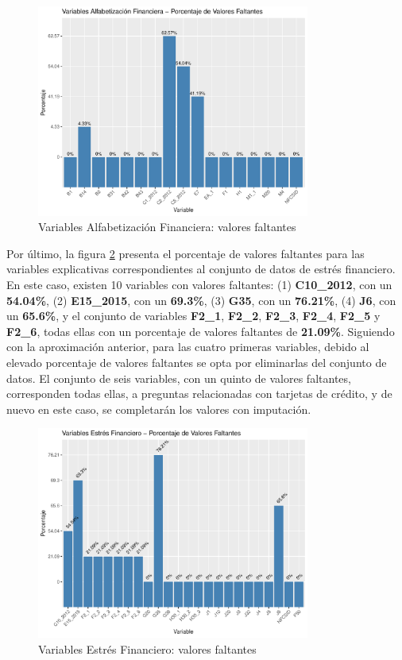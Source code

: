 \documentclass[a4paper, 11pt]{article}
\begin{document}
\begin{figure}[ht]
    \centering
    \includegraphics[width=0.8\textwidth]{images/Capabilities_Features__Missing_Values.pdf} 
    \caption{Variables Alfabetización Financiera: valores faltantes}
    \label{fig:capabilities_features_missing_values}
\end{figure}

Por último, la figura \ref{fig:stress_features_missing_values} presenta el porcentaje de valores
faltantes para las variables explicativas correspondientes al conjunto de datos de estrés
financiero. En este caso, existen 10 variables con valores faltantes: (1) \textbf{C10\_2012}, con 
un \textbf{54.04\%}, (2) \textbf{E15\_2015}, con un \textbf{69.3\%}, (3) \textbf{G35}, con un 
\textbf{76.21\%}, (4) \textbf{J6}, con un \textbf{65.6\%}, y el conjunto de variables
\textbf{F2\_1}, \textbf{F2\_2}, \textbf{F2\_3}, \textbf{F2\_4}, \textbf{F2\_5} y \textbf{F2\_6}, 
todas ellas con un porcentaje de valores faltantes de \textbf{21.09\%}. Siguiendo con la 
aproximación anterior, para las cuatro primeras variables, debido al elevado porcentaje de 
valores faltantes se opta por eliminarlas del conjunto de datos. El conjunto de seis variables,
con un quinto de valores faltantes, corresponden todas ellas, a preguntas relacionadas con 
tarjetas de crédito, y de nuevo en este caso, se completarán los valores con imputación.

\begin{figure}[ht]
    \centering
    \includegraphics[width=0.8\textwidth]{images/Stress_Features__Missing_Values.pdf} 
    \caption{Variables Estrés Financiero: valores faltantes}
    \label{fig:stress_features_missing_values}
\end{figure}
\end{document}
